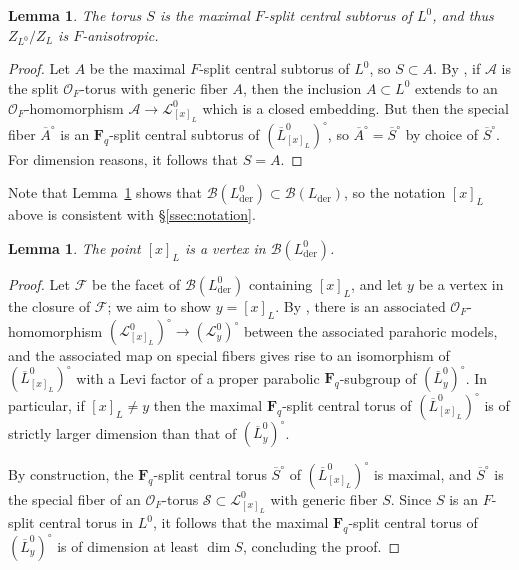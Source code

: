 \documentclass[reqno]{amsart}
\numberwithin{equation}{subsection}
\newcommand{\F}{\mathbf{F}}
\newcommand{\ol}[1]{\overline{#1}}
\newcommand\cA{\mathcal{A}}
\newcommand\cB{\mathcal{B}}
\newcommand\cF{\mathcal{F}}
\newcommand\cL{\mathcal{L}}
\newcommand\cO{\mathcal{O}}
\newcommand\cS{\mathcal{S}}
\DeclareMathOperator{\der}{der}
\newtheorem{lemma}[thm]{Lemma}
\theoremstyle{remark}
\numberwithin{equation}{subsection}
\numberwithin{figure}{subsection}
\begin{document}
\begin{lemma}\label{lemma:descended-yu-datum-anisotropic}
The torus $S$ is the maximal $F$-split central subtorus of $L^0$, and thus $Z_{L^0}/Z_L$ is $F$-anisotropic.
\end{lemma}

\begin{proof}
Let $A$ be the maximal $F$-split central subtorus of $L^0$, so $S \subset A$. By \cite[Axiom 4.1.20]{KP}, if $\cA$ is the split $\cO_F$-torus with generic fiber $A$, then the inclusion $A \subset L^0$ extends to an $\cO_F$-homomorphism $\cA \to \cL^0_{[x]_L}$ which is a closed embedding. But then the special fiber $\ol A^\circ$ is an $\F_q$-split central subtorus of $(\ol L^0_{[x]_L})^\circ$, so $\ol A^\circ = \ol S^\circ$ by choice of $\ol S^\circ$. For dimension reasons, it follows that $S=A$.
\end{proof}

Note that Lemma~\ref{lemma:descended-yu-datum-anisotropic} shows that $\cB(L^0_{\der}) \subset \cB(L_{\der})$, so the notation $[x]_L$ above is consistent with \S\ref{ssec:notation}.

\begin{lemma}\label{lemma:descended-yu-datum-vertex}
The point $[x]_L$ is a vertex in $\cB(L^0_{\der})$.
\end{lemma}

\begin{proof}
Let $\cF$ be the facet of $\cB(L^0_{\der})$ containing $[x]_L$, and let $y$ be a vertex in the closure of $\cF$; we aim to show $y=[x]_L$. By \cite[Axiom 4.1.22]{KP}, there is an associated $\cO_F$-homomorphism $(\cL^0_{[x]_L})^\circ \to (\cL^0_y)^\circ$ between the associated parahoric models, and the associated map on special fibers gives rise to an isomorphism of $(\ol L^0_{[x]_L})^\circ$ with a Levi factor of a proper parabolic $\F_q$-subgroup of $(\ol L^0_y)^\circ$. In particular, if $[x]_L\neq y$ then the maximal $\F_q$-split central torus of $(\ol L^0_{[x]_L})^\circ$ is of strictly larger dimension than that of $(\ol L^0_y)^\circ$.

By construction, the $\F_q$-split central torus $\ol S^\circ$ of $(\ol L^0_{[x]_L})^\circ$ is maximal, and $\ol S^\circ$ is the special fiber of an $\cO_F$-torus $\cS \subset \cL^0_{[x]_L}$ with generic fiber $S$. Since $S$ is an $F$-split central torus in $L^0$, it follows that the maximal $\F_q$-split central torus of $(\ol L^0_y)^\circ$ is of dimension at least $\dim S$, concluding the proof.
\end{proof}
\end{document}
